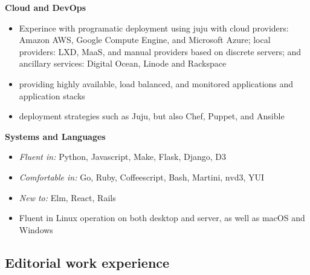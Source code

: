 \documentclass[letterpaper]{memoir}
\begin{document}
\hspace{-1.5em}\textbf{Cloud and DevOps}

\begin{itemize}
  \item Experince with programatic deployment using juju with cloud providers: Amazon AWS, Google Compute Engine, and Microsoft Azure; local providers: LXD, MaaS, and manual providers based on discrete servers; and ancillary services: Digital Ocean, Linode and Rackspace
  \item providing highly available, load balanced, and monitored applications and application stacks
  \item deployment strategies such as Juju, but also Chef, Puppet, and Ansible
\end{itemize}

\hspace{-1.5em}\textbf{Systems and Languages}

\begin{itemize}
  \item \textit{Fluent in:} Python, Javascript, Make, Flask, Django, D3
  \item \textit{Comfortable in:} Go, Ruby, Coffeescript, Bash, Martini, nvd3, YUI
  \item \textit{New to:} Elm, React, Rails
  \item Fluent in Linux operation on both desktop and server, as well as macOS and Windows
\end{itemize}

\newpage

\subsection{Editorial work experience}
\end{document}
